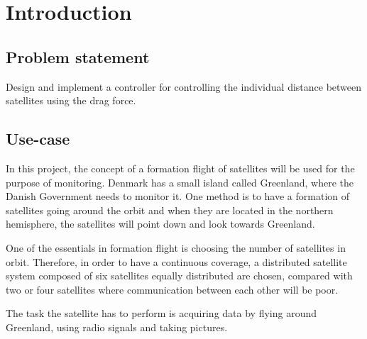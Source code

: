 \chapter{Introduction}\label{chap:Introduction}

\section{Problem statement}
Design and implement a controller for controlling the individual distance between satellites using the drag force.
\section{Use-case}\label{sec:useCase}
In this project, the concept of a formation flight of satellites will be used for the purpose of monitoring. Denmark has a small island called Greenland, where the Danish Government needs to monitor it. One method is to have a formation of satellites going around the orbit and when they are located in the northern hemisphere, the satellites will point down and look towards Greenland. 

One of the essentials in formation flight is choosing the number of satellites in orbit. Therefore, in order to have a continuous coverage, a distributed satellite system composed of six satellites equally distributed are chosen, compared with two or four satellites where communication between each other will be poor.

The task the satellite has to perform is acquiring data by flying around Greenland, using radio signals and taking pictures.

